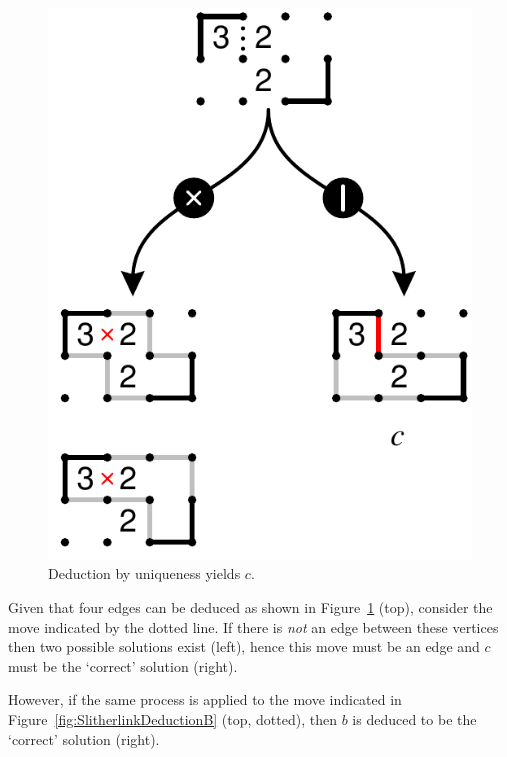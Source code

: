 \documentclass[12pt]{gapd}
\begin{document}
\begin{figure}[htb]
  \centering
  \includegraphics[width=0.85\columnwidth]{graphics/slitherlink-deduce-a2.pdf}
  \caption{Deduction by uniqueness yields $c$.}
  \label{fig:SlitherlinkDeductionA}
\end{figure}

Given that four edges can be deduced as shown in
Figure~\ref{fig:SlitherlinkDeductionA} (top), consider the move
indicated by the dotted line.  If there is \textit{not} an edge between
these vertices then two possible solutions exist (left), hence this
move must be an edge and $c$ must be the `correct' solution (right).

However, if the same process is applied to the move indicated in
Figure~\ref{fig:SlitherlinkDeductionB} (top, dotted), then $b$ is
deduced to be the `correct' solution (right).
\end{document}
